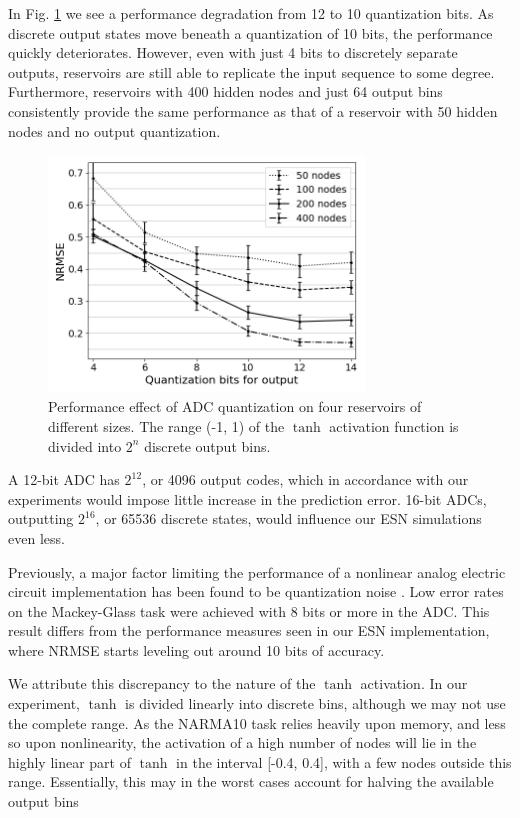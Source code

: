 In Fig. \ref{adc_quantization} we see a performance degradation from 12 to 10
quantization bits. As discrete output states move beneath a quantization of 10
bits, the performance quickly deteriorates. However, even with just 4 bits to
discretely separate outputs, reservoirs are still able to replicate the input
sequence to some degree. Furthermore, reservoirs with 400 hidden nodes and just
64 output bins consistently provide the same performance as that of a reservoir
with 50 hidden nodes and no output quantization.

\begin{figure}[H]
  \centering
  \includegraphics[width=3.3in]{img/adc_quantization.png}
  \caption{
    Performance effect of ADC quantization on four reservoirs of different
sizes. The range (-1, 1) of the $\tanh$ activation function is divided into
$2^n$ discrete output bins.
  }
  \label{adc_quantization}
\end{figure}

A 12-bit ADC has $2^{12}$, or 4096 output codes, which in accordance with our
experiments would impose little increase in the prediction error. 16-bit ADCs,
outputting $2^{16}$, or 65536 discrete states, would influence our ESN
simulations even less.

Previously, a major factor limiting the performance of a nonlinear analog
electric circuit implementation has been found to be quantization noise
\cite{soriano_delay-based_2015}. Low error rates on the Mackey-Glass task were
achieved with 8 bits or more in the ADC. This result differs from the
performance measures seen in our ESN implementation, where NRMSE starts leveling
out around 10 bits of accuracy.

We attribute this discrepancy to the nature of the $\tanh$ activation. In our
experiment, $\tanh$ is divided linearly into discrete bins, although we may not
use the complete range. As the NARMA10 task relies heavily upon memory, and less
so upon nonlinearity, the activation of a high number of nodes will lie in the
highly linear part of $\tanh$ in the interval [-0.4, 0.4], with a few nodes
outside this range. Essentially, this may in the worst cases account for halving
the available output bins

